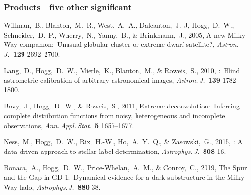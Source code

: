 \documentclass[12pt, fullpage, letterpaper]{article}
\newcommand{\doi}[2]{#2}
\begin{document}
\subsubsection*{Products---five other significant} %
\begin{list}{}{\hogglist}
\item
Willman,~B., Blanton,~M.~R., West,~A.~A., Dalcanton,~J.~J, Hogg,~D.~W., Schneider,~D.~P., Wherry,~N., Yanny,~B., \& Brinkmann,~J., 2005,
\doi{10.1086/430214}{A new Milky Way companion:\ Unusual globular cluster or extreme dwarf satellite?},
\textit{Astron.\,J.}\ \textbf{129} 2692--2700.
\item
Lang,~D., Hogg,~D.~W., Mierle,~K., Blanton,~M., \& Roweis,~S., 2010,
\doi{10.1088/0004-6256/139/5/1782}{:\ Blind astrometric calibration of arbitrary astronomical images},
\textit{Astron.\,J.}\ \textbf{139} 1782--1800.
\item
Bovy,~J., Hogg,~D.~W., \& Roweis,~S., 2011,
\doi{10.1214/10-AOAS439}{Extreme deconvolution:\ Inferring complete distribution functions from noisy, heterogeneous and incomplete observations},
\textit{Ann.\,Appl.\,Stat.}\ \textbf{5} 1657--1677.
\item
Ness,~M., Hogg,~D.~W., Rix,~H.-W., Ho,~A.~Y.~Q., \& Zasowski,~G., 2015,
\doi{10.1088/0004-637X/808/1/16}{: A data-driven
approach to stellar label determination},
\textit{Astrophys.\,J.}\ \textbf{808} 16.
\item
Bonaca,~A., Hogg,~D.~W., Price-Whelan,~A.~M., \& Conroy,~C., 2019,
\doi{10.3847/1538-4357/ab2873}{The Spur and the Gap in GD-1:\ Dynamical evidence for a dark substructure in the Milky Way halo},
\textit{Astrophys.\,J.}\ \textbf{880} 38.
\end{list}
\end{document}
